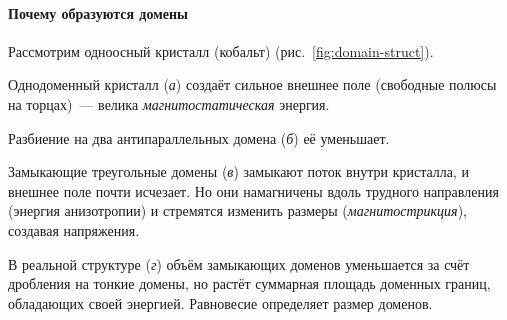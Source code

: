\paragraph{Почему образуются домены}
Рассмотрим одноосный кристалл (кобальт) (рис.~\ref{fig:domain-struct}).
\begin{shagi}
\item Однодоменный кристалл (\textit{а}) создаёт сильное внешнее поле
(свободные полюсы на торцах)~— велика \emph{магнитостатическая} энергия.
\item Разбиение на два антипараллельных домена (\textit{б}) её уменьшает.
\item Замыкающие треугольные домены (\textit{в}) замыкают поток внутри
кристалла, и внешнее поле почти исчезает. Но они намагничены вдоль
трудного направления (энергия анизотропии) и стремятся изменить размеры
(\emph{магнитострикция}), создавая напряжения.
\item В реальной структуре (\textit{г}) объём замыкающих доменов
уменьшается за счёт дробления на тонкие домены, но растёт суммарная
площадь доменных границ, обладающих своей энергией. Равновесие
определяет размер доменов.
\end{shagi}

